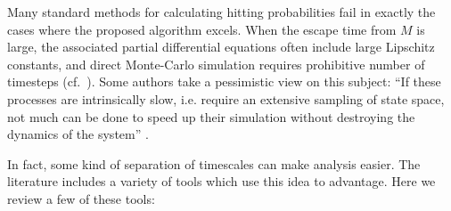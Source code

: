 \documentclass[12pt, nofootinbib,english, amsmath, amssymb, aps, priprint, graphicx,floatfix]{revtex4-1}
\theoremstyle{plain}
\theoremstyle{definition}
\theoremstyle{plain}
\begin{document}
Many standard methods for calculating hitting probabilities fail in exactly the cases where the proposed algorithm excels.  When the escape time from $M$ is large, the associated partial differential equations often include large Lipschitz constants, and direct Monte-Carlo simulation requires prohibitive number of timesteps (cf.\ \cite{Baum1986-we, Wille1987-tf, Machta2009-gh}).  Some authors take a pessimistic view on this subject: ``If these processes are intrinsically slow, i.e. require an extensive sampling of state space, not much can be done to speed up their simulation without destroying the dynamics of the system'' \cite{Christen2008-ge}.  

In fact, some kind of separation of timescales can make analysis easier.   The literature includes a variety of tools which use this idea to advantage.  Here we review a few of these tools:
\end{document}
